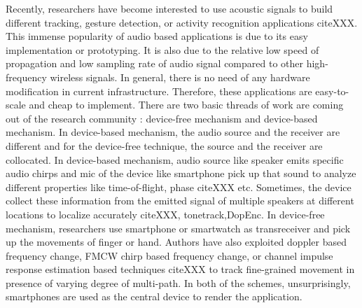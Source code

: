 Recently, researchers have become interested to use acoustic signals to build different tracking, gesture detection, or activity recognition applications cite{XXX}. This immense popularity of audio based applications is due to its easy implementation or prototyping. It is also due to the relative low speed of propagation and low sampling rate of audio signal compared to other high-frequency wireless signals. In general, there is no need of any hardware modification in current infrastructure. Therefore, these applications are easy-to-scale and cheap to implement. There are two basic threads of work are coming out of the research community : device-free mechanism and device-based mechanism. In device-based mechanism, the audio source and the receiver are different and for the device-free technique, the source and the receiver are collocated. In device-based mechanism, audio source like speaker emits specific audio chirps and mic of the device like smartphone pick up that sound to analyze different properties like time-of-flight, phase cite{XXX} etc. Sometimes, the device collect these information from the emitted signal of multiple speakers at different locations to localize accurately cite{XXX, tonetrack,DopEnc}. In device-free mechanism, researchers use smartphone or smartwatch as transreceiver and pick up the movements of finger or hand. Authors have also exploited doppler based frequency change, FMCW chirp based frequency change, or channel impulse response estimation based techniques cite{XXX} to track fine-grained movement in presence of varying degree of multi-path. In both of the schemes, unsurprisingly, smartphones are used as the central device to render the application.\\ 

